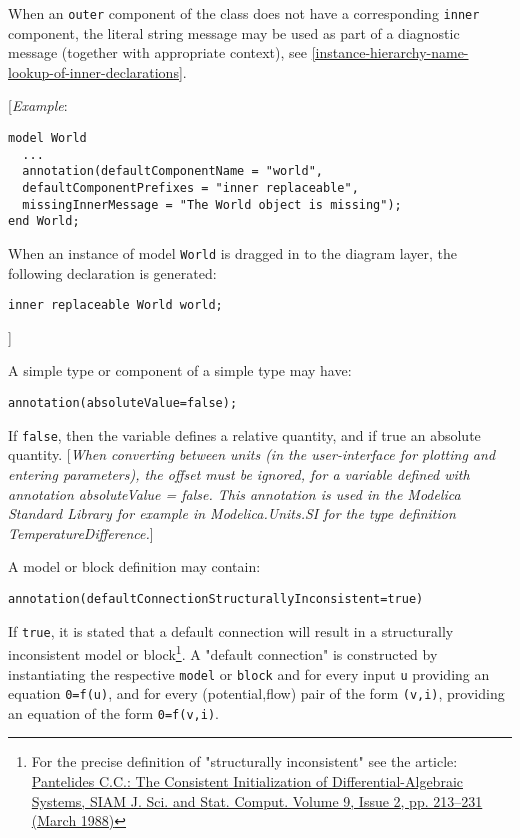 When an \lstinline!outer! component of the class does not have a corresponding \lstinline!inner!
component, the literal string message may be used as part of a diagnostic message (together with appropriate context), see
\autoref{instance-hierarchy-name-lookup-of-inner-declarations}.

{[}\emph{Example}:

\begin{lstlisting}[language=modelica]
model World
  ...
  annotation(defaultComponentName = "world",
  defaultComponentPrefixes = "inner replaceable",
  missingInnerMessage = "The World object is missing");
end World;
\end{lstlisting}
When an instance of model \lstinline!World! is dragged in to the diagram layer, the
following declaration is generated:
\begin{lstlisting}[language=modelica]
  inner replaceable World world;
\end{lstlisting}

{]}

A simple type or component of a simple type may have:
\begin{lstlisting}[language=modelica]
  annotation(absoluteValue=false);
\end{lstlisting}

If \lstinline!false!, then the variable defines a relative quantity, and if true an
absolute quantity. {[}\emph{When converting between units (in the
user-interface for plotting and entering parameters), the offset must be
ignored, for a variable defined with annotation absoluteValue = false.
This annotation is used in the Modelica Standard Library for example in
Modelica.Units.SI for the type definition TemperatureDifference.}{]}

A model or block definition may contain:
\begin{lstlisting}[language=modelica]
  annotation(defaultConnectionStructurallyInconsistent=true)
\end{lstlisting}

If \lstinline!true!, it is stated that a default connection will result in a
structurally inconsistent model or block\footnote{For the precise
  definition of "structurally inconsistent" see the article:
  \href{http://epubs.siam.org/doi/abs/10.1137/0909014}{Pantelides C.C.:
  The Consistent Initialization of Differential-Algebraic Systems, SIAM
  J. Sci. and Stat. Comput. Volume 9, Issue 2, pp. 213--231 (March
  1988)}}. A "default connection" is constructed by instantiating the
respective \lstinline!model! or \lstinline!block! and for every input \lstinline!u! providing an equation
\lstinline!0=f(u)!, and for every (potential,flow) pair of the form \lstinline!(v,i)!, providing
an equation of the form \lstinline!0=f(v,i)!.

